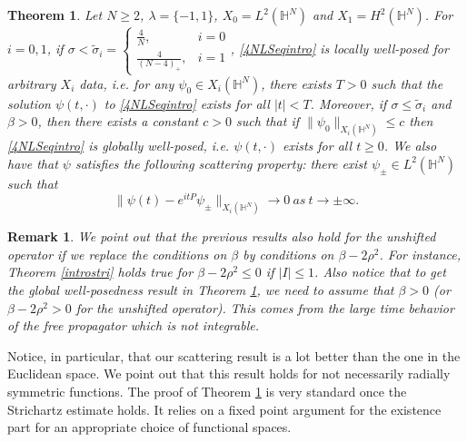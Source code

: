 \documentclass[10pt,leqno]{amsart}
\newtheorem{thm}{Theorem}[section]
\newtheorem{rmq}{Remark}[section]
\numberwithin{equation}{section}
\newcommand{\field}[1]{\mathbb{#1}}
\newcommand{\Hy}{\field{H}}
\begin{document}
\begin{thm}
\label{thmexintro}
Let $N\geq 2$, $\lambda=\{-1,1\}$, $X_0=L^2 (\Hy^N)$ and $X_1 =H^2 (\Hy^N)$. For $i=0,1$, if $\sigma < \tilde{\sigma}_i= \begin{cases}  \tfrac{4}{N},& i=0\\ \tfrac{4}{(N-4)_+} ,&i=1 \end{cases}$, \eqref{4NLSeqintro} is locally well-posed for arbitrary $X_i$ data, i.e. for any $\psi_0\in X_i (\mathbb{H}^N)$, there exists $T>0$ such that the solution $\psi(t,\cdot)$  to \eqref{4NLSeqintro} exists for all $|t|< T$. Moreover, if $\sigma \leq \tilde{\sigma}_i$ and $\beta>0$, then there exists a constant $c>0$ such that if $\|\psi_0\|_{X_i (\mathbb{H}^N )}\leq c$ then \eqref{4NLSeqintro} is globally well-posed, i.e. $\psi (t,\cdot)$ exists for all $t\geq 0$. We also have that $\psi$ satisfies the following scattering property: there exist $\psi_\pm \in L^2 (\Hy^N)$ such that
$$\|\psi(t)- e^{itP}\psi_\pm \|_{X_i (\Hy^N)} \rightarrow 0\ as\ t\rightarrow \pm \infty.$$
\end{thm}
\begin{rmq}
We point out that the previous results also hold for the unshifted operator if we replace the conditions on $\beta$ by conditions on $\beta - 2\rho^2$. For instance, Theorem \ref{introstri} holds true for $\beta - 2\rho^2 \leq 0$ if $|I|\leq 1$. Also notice that to get the global well-posedness result in Theorem \ref{thmexintro}, we need to assume that $\beta>0$ (or $\beta - 2\rho^2>0$ for the unshifted operator). This comes from the large time behavior of the free propagator which is not integrable. 
\end{rmq}
Notice, in particular, that our scattering result is a lot better than the one in the Euclidean space. We point out that this result holds for not necessarily radially symmetric functions. The proof of Theorem \ref{thmexintro} is very standard once the Strichartz estimate holds. It relies on a fixed point argument for the existence part for an appropriate choice of functional spaces. 
\end{document}
